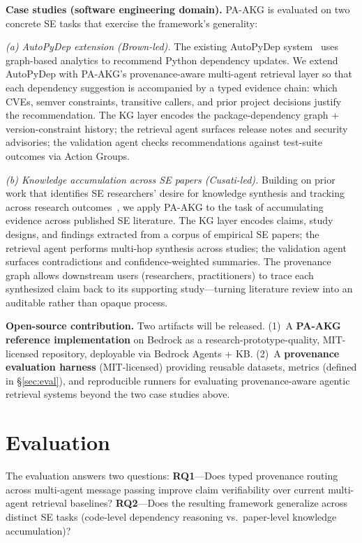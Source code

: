 \documentclass[11pt]{proposalnsf}
\begin{document}
\textbf{Case studies (software engineering domain).} PA-AKG is evaluated on two concrete SE tasks that exercise the framework's generality:

\textit{(a) AutoPyDep extension (Brown-led).} The existing AutoPyDep system~\cite{bose2025autopydep} uses graph-based analytics to recommend Python dependency updates. We extend AutoPyDep with PA-AKG's provenance-aware multi-agent retrieval layer so that each dependency suggestion is accompanied by a typed evidence chain: which CVEs, semver constraints, transitive callers, and prior project decisions justify the recommendation. The KG layer encodes the package-dependency graph + version-constraint history; the retrieval agent surfaces release notes and security advisories; the validation agent checks recommendations against test-suite outcomes via Action Groups.

\textit{(b) Knowledge accumulation across SE papers (Cusati-led).} Building on prior work that identifies SE researchers' desire for knowledge synthesis and tracking across research outcomes~\cite{cusati2026fose,brown2025esem}, we apply PA-AKG to the task of accumulating evidence across published SE literature. The KG layer encodes claims, study designs, and findings extracted from a corpus of empirical SE papers; the retrieval agent performs multi-hop synthesis across studies; the validation agent surfaces contradictions and confidence-weighted summaries. The provenance graph allows downstream users (researchers, practitioners) to trace each synthesized claim back to its supporting study—turning literature review into an auditable rather than opaque process.

\textbf{Open-source contribution.} Two artifacts will be released. (1)~A \textbf{PA-AKG reference implementation} on Bedrock as a research-prototype-quality, MIT-licensed repository, deployable via Bedrock Agents + KB. (2)~A \textbf{provenance evaluation harness} (MIT-licensed) providing reusable datasets, metrics (defined in \S\ref{sec:eval}), and reproducible runners for evaluating provenance-aware agentic retrieval systems beyond the two case studies above.

\section*{\normalsize Evaluation}\label{sec:eval}

The evaluation answers two questions: \textbf{RQ1}---Does typed provenance routing across multi-agent message passing improve claim verifiability over current multi-agent retrieval baselines? \textbf{RQ2}---Does the resulting framework generalize across distinct SE tasks (code-level dependency reasoning vs.\ paper-level knowledge accumulation)?
\end{document}
